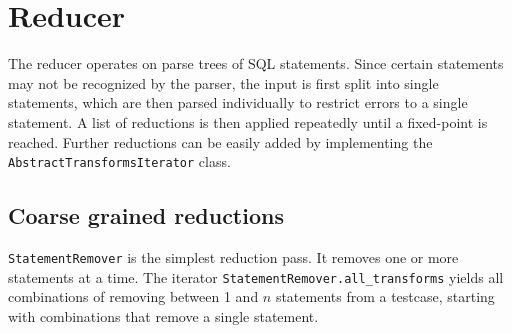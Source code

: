 \section{Reducer}
The reducer operates on parse trees of SQL statements. Since certain statements may not be recognized by the parser, the input is first split into single statements, which are then parsed individually to restrict errors to a single statement. A list of reductions is then applied repeatedly until a fixed-point is reached. Further reductions can be easily added by implementing the 
\texttt{AbstractTransformsIterator} class.

\subsection{Coarse grained reductions}

\texttt{StatementRemover} is the simplest reduction pass. It removes one or more statements at a time. The iterator \texttt{StatementRemover.all\_transforms} yields all combinations of removing between 1 and $n$ statements from a testcase, starting with combinations that remove a single statement.
